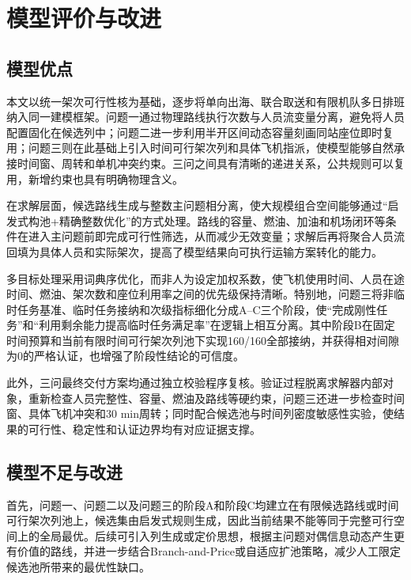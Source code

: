 
\section{模型评价与改进}\label{sec:evaluation}

\subsection{模型优点}\label{subsec:model-strengths}

本文以统一架次可行性核为基础，逐步将单向出海、联合取送和有限机队多日排班纳入同一建模框架。问题一通过物理路线执行次数与人员流变量分离，避免将人员配置固化在候选列中；问题二进一步利用半开区间动态容量刻画同站座位即时复用；问题三则在此基础上引入时间可行架次列和具体飞机指派，使模型能够自然承接时间窗、周转和单机冲突约束。三问之间具有清晰的递进关系，公共规则可以复用，新增约束也具有明确物理含义。

在求解层面，候选路线生成与整数主问题相分离，使大规模组合空间能够通过“启发式构池+精确整数优化”的方式处理。路线的容量、燃油、加油和机场闭环等条件在进入主问题前即完成可行性筛选，从而减少无效变量；求解后再将聚合人员流回填为具体人员和实际架次，提高了模型结果向可执行运输方案转化的能力。

多目标处理采用词典序优化，而非人为设定加权系数，使飞机使用时间、人员在途时间、燃油、架次数和座位利用率之间的优先级保持清晰。特别地，问题三将非临时任务基准、临时任务接纳和次级指标细化分成A--C三个阶段，使“完成刚性任务”和“利用剩余能力提高临时任务满足率”在逻辑上相互分离。其中阶段B在固定时间预算和当前有限时间可行架次列池下实现160/160全部接纳，并获得相对间隙为0的严格认证，也增强了阶段性结论的可信度。

此外，三问最终交付方案均通过独立校验程序复核。验证过程脱离求解器内部对象，重新检查人员完整性、容量、燃油及路线等硬约束，问题三还进一步检查时间窗、具体飞机冲突和30 min周转；同时配合候选池与时间列密度敏感性实验，使结果的可行性、稳定性和认证边界均有对应证据支撑。

\subsection{模型不足与改进}\label{subsec:model-limitations}

首先，问题一、问题二以及问题三的阶段A和阶段C均建立在有限候选路线或时间可行架次列池上，候选集由启发式规则生成，因此当前结果不能等同于完整可行空间上的全局最优。后续可引入列生成或定价思想，根据主问题对偶信息动态产生更有价值的路线，并进一步结合Branch-and-Price或自适应扩池策略，减少人工限定候选池所带来的最优性缺口。


